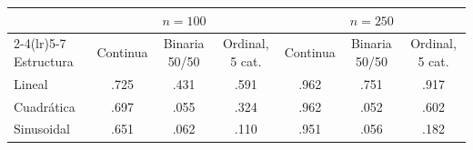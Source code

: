 \begin{tabular}{lcccccc}
\toprule
 & \multicolumn{3}{c}{$n = 100$} & \multicolumn{3}{c}{$n = 250$} \\
\cmidrule(lr){2-4}\cmidrule(lr){5-7}
Estructura & Continua & Binaria 50/50 & Ordinal, 5 cat. & Continua & Binaria 50/50 & Ordinal, 5 cat. \\
\midrule
Lineal & .725 & .431 & .591 & .962 & .751 & .917 \\
Cuadr\'atica & .697 & .055 & .324 & .962 & .052 & .602 \\
Sinusoidal & .651 & .062 & .110 & .951 & .056 & .182 \\
\bottomrule
\end{tabular}
